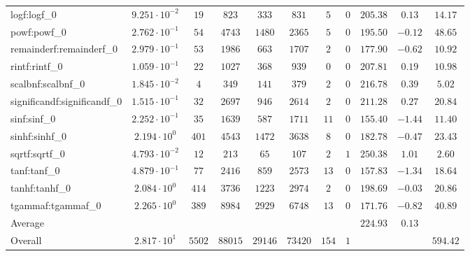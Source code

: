 \begin{tabular}{|l|c|c|c|c|c|c|c|c|c|c|}
logf:logf\_0                 & $ 9.251 \cdot 10^{-2} $ & $ 19     $ & $ 823   $ & $ 333   $ & $ 831   $ & $ 5   $ & $ 0 $ & $ 205.38      $ & $ 0.13    $ & $ 14.17   $ \\
powf:powf\_0                 & $ 2.762 \cdot 10^{-1} $ & $ 54     $ & $ 4743  $ & $ 1480  $ & $ 2365  $ & $ 5   $ & $ 0 $ & $ 195.50      $ & $ -0.12   $ & $ 48.65   $ \\
remainderf:remainderf\_0     & $ 2.979 \cdot 10^{-1} $ & $ 53     $ & $ 1986  $ & $ 663   $ & $ 1707  $ & $ 2   $ & $ 0 $ & $ 177.90      $ & $ -0.62   $ & $ 10.92   $ \\
rintf:rintf\_0               & $ 1.059 \cdot 10^{-1} $ & $ 22     $ & $ 1027  $ & $ 368   $ & $ 939   $ & $ 0   $ & $ 0 $ & $ 207.81      $ & $ 0.19    $ & $ 10.98   $ \\
scalbnf:scalbnf\_0           & $ 1.845 \cdot 10^{-2} $ & $ 4      $ & $ 349   $ & $ 141   $ & $ 379   $ & $ 2   $ & $ 0 $ & $ 216.78      $ & $ 0.39    $ & $ 5.02    $ \\
significandf:significandf\_0 & $ 1.515 \cdot 10^{-1} $ & $ 32     $ & $ 2697  $ & $ 946   $ & $ 2614  $ & $ 2   $ & $ 0 $ & $ 211.28      $ & $ 0.27    $ & $ 20.84   $ \\
sinf:sinf\_0                 & $ 2.252 \cdot 10^{-1} $ & $ 35     $ & $ 1639  $ & $ 587   $ & $ 1711  $ & $ 11  $ & $ 0 $ & $ 155.40      $ & $ -1.44   $ & $ 11.40   $ \\
sinhf:sinhf\_0               & $ 2.194 \cdot 10^{0}  $ & $ 401    $ & $ 4543  $ & $ 1472  $ & $ 3638  $ & $ 8   $ & $ 0 $ & $ 182.78      $ & $ -0.47   $ & $ 23.43   $ \\
sqrtf:sqrtf\_0               & $ 4.793 \cdot 10^{-2} $ & $ 12     $ & $ 213   $ & $ 65    $ & $ 107   $ & $ 2   $ & $ 1 $ & $ 250.38      $ & $ 1.01    $ & $ 2.60    $ \\
tanf:tanf\_0                 & $ 4.879 \cdot 10^{-1} $ & $ 77     $ & $ 2416  $ & $ 859   $ & $ 2573  $ & $ 13  $ & $ 0 $ & $ 157.83      $ & $ -1.34   $ & $ 18.64   $ \\
tanhf:tanhf\_0               & $ 2.084 \cdot 10^{0}  $ & $ 414    $ & $ 3736  $ & $ 1223  $ & $ 2974  $ & $ 2   $ & $ 0 $ & $ 198.69      $ & $ -0.03   $ & $ 20.86   $ \\
tgammaf:tgammaf\_0           & $ 2.265 \cdot 10^{0}  $ & $ 389    $ & $ 8984  $ & $ 2929  $ & $ 6748  $ & $ 13  $ & $ 0 $ & $ 171.76      $ & $ -0.82   $ & $ 40.89   $ \\
\hline
Average                      & $                     $ & $        $ & $       $ & $       $ & $       $ & $     $ & $   $ & $ 224.93      $ & $ 0.13    $ & $         $ \\
\hline
Overall                      & $ 2.817 \cdot 10^{1}  $ & $ 5502   $ & $ 88015 $ & $ 29146 $ & $ 73420 $ & $ 154 $ & $ 1 $ & $             $ & $         $ & $ 594.42  $ \\
\hline
\end{tabular}
